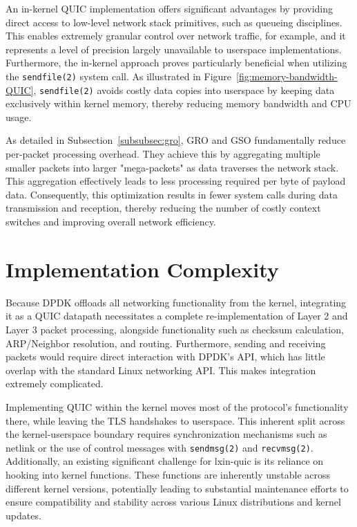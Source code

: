 An in-kernel QUIC implementation offers significant advantages by providing direct access to low-level network stack primitives, such as queueing disciplines. This enables extremely granular control over network traffic, for example, and it represents a level of precision largely unavailable to userspace implementations. Furthermore, the in-kernel approach proves particularly beneficial when utilizing the \texttt{sendfile(2)} system call. As illustrated in Figure~\ref{fig:memory-bandwidth-QUIC}, \texttt{sendfile(2)} avoids costly data copies into userspace by keeping data exclusively within kernel memory, thereby reducing memory bandwidth and CPU usage.

As detailed in Subsection~\ref{subsubsec:gro}, \ac{GRO} and \ac{GSO} fundamentally reduce per-packet processing overhead. They achieve this by aggregating multiple smaller packets into larger "mega-packets" as data traverses the network stack. This aggregation effectively leads to less processing required per byte of payload data. Consequently, this optimization results in fewer system calls during data transmission and reception, thereby reducing the number of costly context switches and improving overall network efficiency.

\section{Implementation Complexity}
\label{subsec:implementation-complexity}

Because \ac{DPDK} offloads all networking functionality from the kernel, integrating it as a QUIC datapath necessitates a complete re-implementation of Layer 2 and Layer 3 packet processing, alongside functionality such as checksum calculation, ARP/Neighbor resolution, and routing. Furthermore, sending and receiving packets would require direct interaction with DPDK's API, which has little overlap with the standard Linux networking API. This makes integration extremely complicated.

Implementing QUIC within the kernel moves most of the protocol's functionality there, while leaving the \ac{TLS} handshakes to userspace. This inherent split across the kernel-userspace boundary requires synchronization mechanisms such as netlink or the use of control messages with \texttt{sendmsg(2)} and \texttt{recvmsg(2)}. Additionally, an existing significant challenge for lxin-quic is its reliance on hooking into kernel functions. These functions are inherently unstable across different kernel versions, potentially leading to substantial maintenance efforts to ensure compatibility and stability across various Linux distributions and kernel updates.

